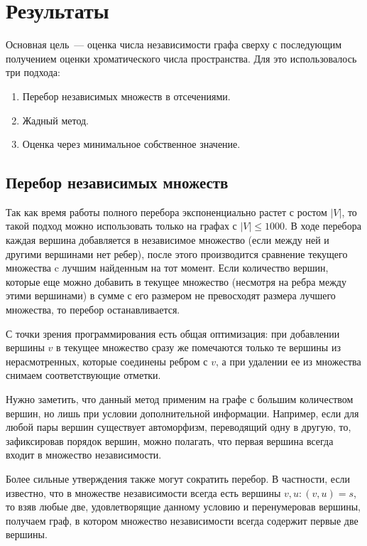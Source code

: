 \section{Результаты}

Основная цель~--- оценка числа независимости графа сверху с последующим
получением оценки хроматического числа пространства. Для это использовалось
три подхода:
\begin{enumerate}
    \item Перебор независимых множеств в отсечениями.
    \item Жадный метод.
    \item Оценка через минимальное собственное значение.
\end{enumerate}

\subsection{Перебор независимых множеств}

Так как время работы полного перебора экспоненциально растет с ростом $|V|$,
то такой подход можно использовать только на графах с $|V| \le 1000$.
В ходе перебора каждая вершина добавляется в независимое множество (если между
ней и другими вершинами нет ребер), после этого производится сравнение текущего
множества c лучшим найденным на тот момент. Если количество вершин, которые еще
можно добавить в текущее множество (несмотря на ребра между этими вершинами) в
сумме с его размером не превосходят размера лучшего множества, то перебор
останавливается.

С точки зрения программирования есть общая оптимизация: при
добавлении вершины $v$ в текущее множество сразу же помечаются только те
вершины из нерасмотренных, которые соединены ребром с $v$, а при удалении ее
из множества снимаем соответствующие отметки.

Нужно заметить, что данный метод применим на графе с большим количеством
вершин, но лишь при условии дополнительной информации.
Например, если для любой пары
вершин существует автоморфизм, переводящий одну в другую, то, зафиксировав
порядок вершин, можно полагать, что первая вершина всегда входит в множество
независимости.

Более сильные утверждения также могут сократить перебор. В частности, если
известно, что в множестве независимости всегда есть вершины $v, u: (v,u) = s$,
то взяв любые две, удовлетворящие данному условию и перенумеровав вершины,
получаем граф, в котором множество независимости всегда содержит первые две
вершины.

